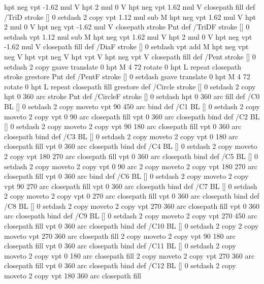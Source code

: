 {{  hpt neg vpt -1.62 mul V
  hpt 2 mul 0 V
  hpt neg vpt 1.62 mul V closepath fill } def
/TriD { stroke [] 0 setdash 2 copy vpt 1.12 mul sub M
  hpt neg vpt 1.62 mul V
  hpt 2 mul 0 V
  hpt neg vpt -1.62 mul V closepath stroke
  Pnt  } def
/TriDF { stroke [] 0 setdash vpt 1.12 mul sub M
  hpt neg vpt 1.62 mul V
  hpt 2 mul 0 V
  hpt neg vpt -1.62 mul V closepath fill} def
/DiaF { stroke [] 0 setdash vpt add M
  hpt neg vpt neg V hpt vpt neg V
  hpt vpt V hpt neg vpt V closepath fill } def
/Pent { stroke [] 0 setdash 2 copy gsave
  translate 0 hpt M 4 {72 rotate 0 hpt L} repeat
  closepath stroke grestore Pnt } def
/PentF { stroke [] 0 setdash gsave
  translate 0 hpt M 4 {72 rotate 0 hpt L} repeat
  closepath fill grestore } def
/Circle { stroke [] 0 setdash 2 copy
  hpt 0 360 arc stroke Pnt } def
/CircleF { stroke [] 0 setdash hpt 0 360 arc fill } def
/C0 { BL [] 0 setdash 2 copy moveto vpt 90 450  arc } bind def
/C1 { BL [] 0 setdash 2 copy        moveto
       2 copy  vpt 0 90 arc closepath fill
               vpt 0 360 arc closepath } bind def
/C2 { BL [] 0 setdash 2 copy moveto
       2 copy  vpt 90 180 arc closepath fill
               vpt 0 360 arc closepath } bind def
/C3 { BL [] 0 setdash 2 copy moveto
       2 copy  vpt 0 180 arc closepath fill
               vpt 0 360 arc closepath } bind def
/C4 { BL [] 0 setdash 2 copy moveto
       2 copy  vpt 180 270 arc closepath fill
               vpt 0 360 arc closepath } bind def
/C5 { BL [] 0 setdash 2 copy moveto
       2 copy  vpt 0 90 arc
       2 copy moveto
       2 copy  vpt 180 270 arc closepath fill
               vpt 0 360 arc } bind def
/C6 { BL [] 0 setdash 2 copy moveto
      2 copy  vpt 90 270 arc closepath fill
              vpt 0 360 arc closepath } bind def
/C7 { BL [] 0 setdash 2 copy moveto
      2 copy  vpt 0 270 arc closepath fill
              vpt 0 360 arc closepath } bind def
/C8 { BL [] 0 setdash 2 copy moveto
      2 copy vpt 270 360 arc closepath fill
              vpt 0 360 arc closepath } bind def
/C9 { BL [] 0 setdash 2 copy moveto
      2 copy  vpt 270 450 arc closepath fill
              vpt 0 360 arc closepath } bind def
/C10 { BL [] 0 setdash 2 copy 2 copy moveto vpt 270 360 arc closepath fill
       2 copy moveto
       2 copy vpt 90 180 arc closepath fill
               vpt 0 360 arc closepath } bind def
/C11 { BL [] 0 setdash 2 copy moveto
       2 copy  vpt 0 180 arc closepath fill
       2 copy moveto
       2 copy  vpt 270 360 arc closepath fill
               vpt 0 360 arc closepath } bind def
/C12 { BL [] 0 setdash 2 copy moveto
       2 copy  vpt 180 360 arc closepath fill
}}
